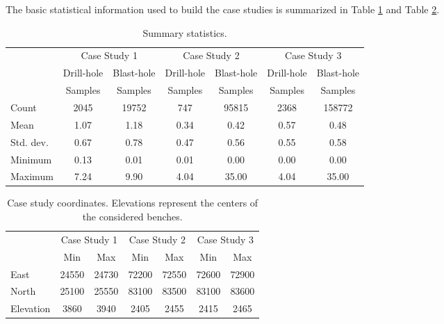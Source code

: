 The basic statistical information used to build the case studies is summarized in Table \ref{tab:stats_PII} and Table \ref{tab:coord_PII}. %
\begin{table}
	\caption{Summary statistics.}
	\label{tab:stats_PII}
	\begin{center}
		\begin{tabular}{lcccccc}\toprule
			& \multicolumn{2}{c}{Case Study 1} & \multicolumn{2}{c}{Case Study 2}& \multicolumn{2}{c}{Case Study 3}\\
			& {Drill-hole} & {Blast-hole} & {Drill-hole} & {Blast-hole} & {Drill-hole} & {Blast-hole}\\
			& {Samples} & {Samples} & {Samples} & {Samples} & {Samples} & {Samples}\\\midrule
			Count     & 2045  & 19752 & 747   & 95815 & 2368  & 158772 \\
			Mean      & 1.07 & 1.18 & 0.34 & 0.42 & 0.57 & 0.48\\
			Std. dev. & 0.67 & 0.78 & 0.47 & 0.56 & 0.55 & 0.58\\
			Minimum   & 0.13  & 0.01  & 0.01 & 0.00  & 0.00  & 0.00\\
			Maximum   & 7.24  & 9.90  & 4.04 & 35.00 & 4.04  & 35.00\\
			\bottomrule
		\end{tabular}
	\end{center}
\end{table}

\begin{table}
	\caption[Case study coordinates.]{Case study coordinates. Elevations represent the centers of the considered benches.}
	\label{tab:coord_PII}
	\begin{center}
		\begin{tabular}{lcccccc}\toprule
			& \multicolumn{2}{c}{Case Study 1} & \multicolumn{2}{c}{Case Study 2}& \multicolumn{2}{c}{Case Study 3}\\
			& {Min}   & {Max}   & {Min}   & {Max}   & {Min} & {Max}\\\midrule
			East      & 24550 & 24730 & 72200 & 72550 & 72600 & 72900 \\
			North     & 25100 & 25550 & 83100 & 83500 & 83100 & 83600 \\
			Elevation & 3860  & 3940  & 2405  & 2455  & 2415  & 2465 \\
			\bottomrule
		\end{tabular}
	\end{center}
\end{table}

